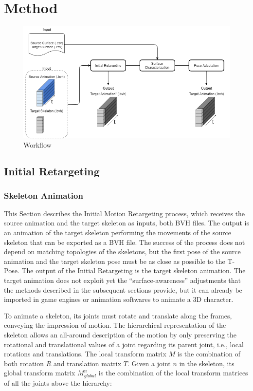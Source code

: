 \documentclass{vgtc}
\makeatletter
\def\maxwidth{\ifdim\Gin@nat@width>\linewidth\linewidth
    \else\Gin@nat@width\fi}
\let\Oldincludegraphics\includegraphics
\renewcommand{\includegraphics}[1]{\Oldincludegraphics[width=.8\maxwidth]{#1}}
\makeatother
\begin{document}
    \section{Method}\label{method}

\begin{figure}
\centering
\includegraphics{../figures/Workflow3.png}
\caption{Workflow}
\end{figure}

    \subsection{Initial Retargeting}\label{initial-retargeting}

\subsubsection{Skeleton Animation}\label{skeleton-animation}

This Section describes the Initial Motion Retargeting process, which
receives the source animation and the target skeleton as inputs, both
BVH files. The output is an animation of the target skeleton performing
the movements of the source skeleton that can be exported as a BVH file.
The success of the process does not depend on matching topologies of the
skeletons, but the first pose of the source animation and the target
skeleton pose must be as close as possible to the T-Pose. The output of
the Initial Retargeting is the target skeleton animation. The target
animation does not exploit yet the ``surface-awareness'' adjustments
that the methods described in the subsequent sections provide, but it
can already be imported in game engines or animation softwares to
animate a 3D character.

To animate a skeleton, its joints must rotate and translate along the
frames, conveying the impression of motion. The hierarchical
representation of the skeleton allows an all-around description of the
motion by only preserving the rotational and translational values of a
joint regarding its parent joint, i.e., local rotations and
translations. The local transform matrix \(M\) is the combination of
both rotation \(R\) and translation matrix \(T\). Given a joint \(n\) in
the skeleton, its global transform matrix \(M_{global}^{n}\) is the
combination of the local transform matrices of all the joints above the
hierarchy:
\end{document}
